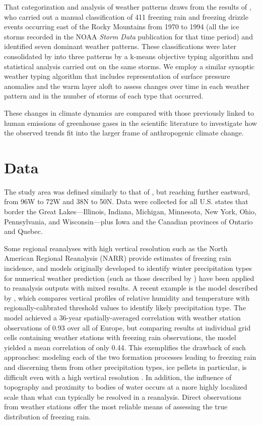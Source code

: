 \documentclass[twocol]{ametsoc}
\begin{document}
That categorization and analysis of weather patterns draws from the results of \citet{rauber2001synoptic}, who carried out a manual classification of 411 freezing rain and freezing drizzle events occurring east of the Rocky Mountains from 1970 to 1994 (all the ice storms recorded in the NOAA \textit{Storm Data} publication for that time period) and identified seven dominant weather patterns. These classifications were later consolidated by \citet{erfani2012automated} into three patterns by a k-means objective typing algorithm and statistical analysis carried out on the same storms. We employ a similar synoptic weather typing algorithm that includes representation of surface pressure anomalies and the warm layer aloft to assess changes over time in each weather pattern and in the number of storms of each type that occurred.

These changes in climate dynamics are compared with those previously linked to human emissions of greenhouse gases in the scientific literature to investigate how the observed trends fit into the larger frame of anthropogenic climate change.

\section{Data}
The study area was defined similarly to that of \citet{cortinas2000climatology}, but reaching further eastward, from 96\degree W to 72\degree W and 38\degree N to 50\degree N. Data were collected for all U.S. states that border the Great Lakes---Illinois, Indiana, Michigan, Minnesota, New York, Ohio, Pennsylvania, and Wisconsin---plus Iowa and the Canadian provinces of Ontario and Quebec. 

Some regional reanalyses with high vertical resolution such as the North American Regional Reanalysis (NARR) provide estimates of freezing rain incidence, and models originally developed to identify winter precipitation types for numerical weather prediction (such as those described by \citet{cortinas2002probabilistic}) have been applied to reanalysis outputs with mixed results. A recent example is the model described by \citet{kamarainen2017method}, which compares vertical profiles of relative humidity and temperature with regionally-calibrated threshold values to identify likely precipitation type. The model achieved a 36-year spatially-averaged correlation with weather station observations of 0.93 over all of Europe, but comparing results at individual grid cells containing weather stations with freezing rain observations, the model yielded a mean correlation of only 0.44. This exemplifies the drawback of such approaches: modeling each of the two formation processes leading to freezing rain and discerning them from other precipitation types, ice pellets in particular, is difficult even with a high vertical resolution \citep{reeves2014sources}. In addition, the influence of topography and proximity to bodies of water occurs at a more highly localized scale than what can typically be resolved in a reanalysis. Direct observations from weather stations offer the most reliable means of assessing the true distribution of freezing rain.
\end{document}
